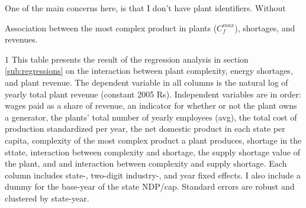 \documentclass[11pt]{article}
\begin{document}
One of the main concerns here, is that I don't have plant identifiers. Without 

\begin{sidewaystable}
	\begin{center}
		\begin{threeparttable}
		\caption{Association between the most complex product in plants ($C^{max}_{f}$), shortages, and revenues.}
			\label{tab:interaction_max_pci}
			
			\begin{tablenotes} \footnotesize
			\item[1] This table presents the result of the regression analysis in section \ref{sub:regressions} on the interaction between plant complexity, energy shortages, and plant revenue. The dependent variable in all columns is the natural log of yearly total plant revenue (constant 2005 Rs). Independent variables are in order: wages paid as a share of revenue, an indicator for whether or not the plant owns a generator, the plants' total number of yearly employees (avg), the total cost of production standardized per year, the net domestic product in each state per capita, complexity of the most complex product a plant produces, shortage in the sttate, interaction between complexity and shortage, the supply shortage value of the plant, and and interaction between complexity and supply shortage. Each column includes state-, two-digit industry-, and year fixed effects. I also include a dummy for the base-year of the state NDP/cap. Standard errors are robust and clustered by state-year.
			\end{tablenotes}
		\end{threeparttable}
	\end{center}
\end{sidewaystable}
\end{document}
